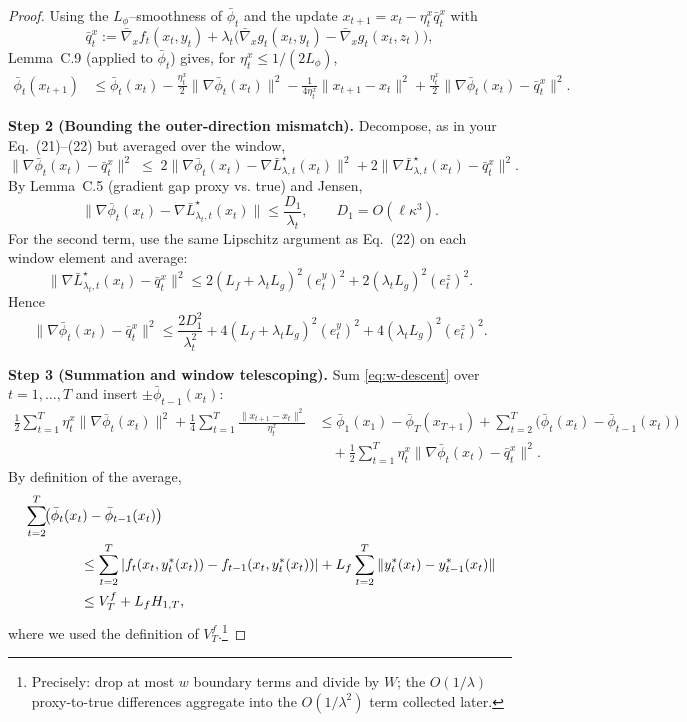 \documentclass{uai2026} %
\begin{document}
\begin{proof} 
Using the $L_\phi$–smoothness of $\bar\phi_t$ and the update $x_{t+1}=x_t-\eta^x_t \bar q^x_t$ with 
\[
\bar q^x_t:=\bar\nabla_x f_t(x_t,y_t)+\lambda_{t}\bigl(\bar\nabla_x g_t(x_t,y_t)-\bar\nabla_x g_t(x_t,z_t)\bigr),
\]
Lemma~C.9 (applied to $\bar\phi_t$) gives, for $\eta^x_t\le 1/(2L_\phi)$,
\begin{align}
\bar\phi_t(x_{t+1})
&\le \bar\phi_t(x_t)-\frac{\eta^x_t}{2}\|\nabla\bar\phi_t(x_t)\|^2-\frac{1}{4\eta^x_t}\|x_{t+1}-x_t\|^2
+\frac{\eta^x_t}{2}\bigl\|\nabla\bar\phi_t(x_t)-\bar q^x_t\bigr\|^2. 
\label{eq:w-descent}
\end{align}

\smallskip
\textbf{Step 2 (Bounding the outer-direction mismatch).}
Decompose, as in your Eq.~(21)–(22) but averaged over the window,
\[
\bigl\|\nabla\bar\phi_t(x_t)-\bar q^x_t\bigr\|^2
\;\le\;2\bigl\|\nabla\bar\phi_t(x_t)-\nabla\bar L^{\star}_{\lambda,t}(x_t)\bigr\|^2
+2\bigl\|\nabla\bar L^{\star}_{\lambda,t}(x_t)-\bar q^x_t\bigr\|^2.
\]
By Lemma~C.5 (gradient gap proxy vs. true) and Jensen, 
\[
\bigl\|\nabla\bar\phi_t(x_t)-\nabla\bar L^{\star}_{\lambda_{t},t}(x_t)\bigr\|
\le \frac{D_1}{\lambda_{t}},\qquad D_1=O(\ell\kappa^3).
\]
For the second term, use the same Lipschitz argument as Eq.~(22) on each window element and average:
\[
\bigl\|\nabla\bar L^{\star}_{\lambda_{t},t}(x_t)-\bar q^x_t\bigr\|^2
\le 2(L_f+\lambda_{t} L_g)^2(e^y_t)^2+2(\lambda_{t} L_g)^2(e^z_t)^2.
\]
Hence
\begin{equation}
\bigl\|\nabla\bar\phi_t(x_t)-\bar q^x_t\bigr\|^2\le \frac{2D_1^2}{\lambda_{t}^2}
+4(L_f+\lambda_{t} L_g)^2(e^y_t)^2+4(\lambda_{t} L_g)^2(e^z_t)^2.
\label{eq:w-mismatch}
\end{equation}

\smallskip
\textbf{Step 3 (Summation and window telescoping).}
Sum \eqref{eq:w-descent} over $t=1,\dots,T$ and insert $\pm\bar\phi_{t-1}(x_t)$:
\begin{align}
\frac{1}{2}\sum_{t=1}^T\eta^x_t\|\nabla\bar\phi_t(x_t)\|^2+\frac{1}{4}\sum_{t=1}^T\frac{\|x_{t+1}-x_t\|^2}{\eta^x_t}
&\le \bar\phi_1(x_1)-\bar\phi_T(x_{T+1})+\sum_{t=2}^T\bigl(\bar\phi_t(x_t)-\bar\phi_{t-1}(x_t)\bigr)
\nonumber\\
&\quad+\frac{1}{2}\sum_{t=1}^T\eta^x_t\bigl\|\nabla\bar\phi_t(x_t)-\bar q^x_t\bigr\|^2.
\label{eq:sum-telescope}
\end{align}
By definition of the average,
\begin{align}
    \MoveEqLeft[4]\sum_{t=2}^T\!\bigl(\bar\phi_t(x_t)-\bar\phi_{t-1}(x_t)\bigr)
\nonumber\\
&\le\sum_{t=2}^{T}|f_{t}(x_{t},y^{*}_{t}(x_{t}))-f_{t-1}(x_{t},y^{*}_{t}(x_{t}))|+L_{f}\sum_{t=2}^{T}\|y^{*}_{t}(x_{t})-y^{*}_{t-1}(x_{t})\|\nonumber\\
&\le  V_T^{f}+L_{f}H_{1,T}, 
\end{align}
where we used the definition of $V_T^f$.\footnote{Precisely: drop at most $w$ boundary terms and divide by $W$; the $O(1/\lambda)$ proxy-to-true differences aggregate into the $O(1/\lambda^2)$ term collected later.}


\end{proof}
\end{document}
